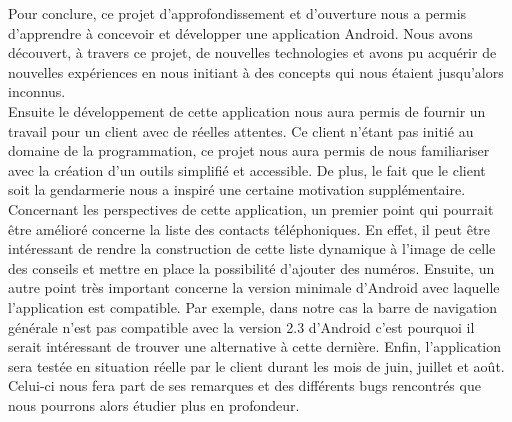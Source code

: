 	Pour conclure, ce projet d’approfondissement et d'ouverture nous a permis d'apprendre à concevoir et développer une application Android. Nous avons découvert, à travers ce projet, de nouvelles technologies et avons pu acquérir de nouvelles expériences en nous initiant à des concepts qui nous étaient jusqu'alors inconnus.
	\\
	
	 Ensuite le développement de cette application nous aura permis de fournir un travail pour un client avec de réelles attentes. Ce client n'étant pas initié au domaine de la programmation, ce projet nous aura permis de nous familiariser avec la création d'un outils simplifié et accessible. De plus, le fait que le client soit la gendarmerie nous a inspiré une certaine motivation supplémentaire.
	 \\
	
	Concernant les perspectives de cette application, un premier point qui pourrait être amélioré concerne la liste des contacts téléphoniques. En effet, il peut être intéressant de rendre la construction de cette liste dynamique à l'image de celle des conseils et mettre en place la possibilité d'ajouter des numéros. Ensuite, un autre point très important concerne la version minimale d'Android avec laquelle l'application est compatible. Par exemple, dans notre cas la barre de navigation générale n'est pas compatible avec la version 2.3 d'Android c'est pourquoi il serait intéressant de trouver une alternative à cette dernière. Enfin, l'application sera testée en situation réelle par le client durant les mois de juin, juillet et août. Celui-ci nous fera part de ses remarques et des différents bugs rencontrés que nous pourrons alors étudier plus en profondeur.